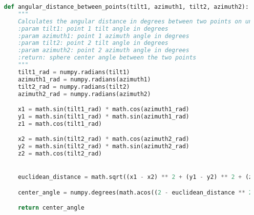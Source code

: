 \begin{lstlisting}[language=Python, caption={Angular distance function}]
def angular_distance_between_points(tilt1, azimuth1, tilt2, azimuth2):
    """
    Calculates the angular distance in degrees between two points on unit sphere surface.
    :param tilt1: point 1 tilt angle in degrees
    :param azimuth1: point 1 azimuth angle in degrees
    :param tilt2: point 2 tilt angle in degrees
    :param azimuth2: point 2 azimuth angle in degrees
    :return: sphere center angle between the two points
    """
    tilt1_rad = numpy.radians(tilt1)
    azimuth1_rad = numpy.radians(azimuth1)
    tilt2_rad = numpy.radians(tilt2)
    azimuth2_rad = numpy.radians(azimuth2)

    x1 = math.sin(tilt1_rad) * math.cos(azimuth1_rad)
    y1 = math.sin(tilt1_rad) * math.sin(azimuth1_rad)
    z1 = math.cos(tilt1_rad)

    x2 = math.sin(tilt2_rad) * math.cos(azimuth2_rad)
    y2 = math.sin(tilt2_rad) * math.sin(azimuth2_rad)
    z2 = math.cos(tilt2_rad)


    euclidean_distance = math.sqrt((x1 - x2) ** 2 + (y1 - y2) ** 2 + (z1 - z2) ** 2)

    center_angle = numpy.degrees(math.acos((2 - euclidean_distance ** 2) / 2))

    return center_angle
\end{lstlisting}